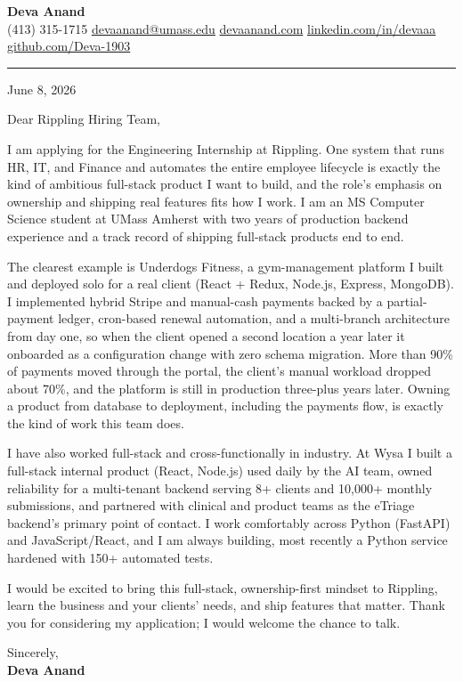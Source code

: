 \documentclass[letterpaper,11pt]{article}
\begin{document}
\pagestyle{empty}

\begin{center}
  {\LARGE \bfseries \textcolor{ResumeNavy}{Deva Anand}} \\ \vspace{3pt}
  \small
  (413) 315-1715 \enspace\textbar\enspace
  \href{mailto:devaanand@umass.edu}{devaanand@umass.edu} \enspace\textbar\enspace
  \href{https://devaanand.com}{devaanand.com} \enspace\textbar\enspace
  \href{https://linkedin.com/in/devaaa/}{linkedin.com/in/devaaa} \enspace\textbar\enspace
  \href{https://github.com/Deva-1903}{github.com/Deva-1903}
\end{center}
\vspace{4pt}
{\color{ResumeNavy}\hrule}
\vspace{10pt}

\textcolor{ResumeSlate}{June 8, 2026}

Dear Rippling Hiring Team,

I am applying for the Engineering Internship at Rippling. One system that runs HR, IT, and Finance and automates the entire employee lifecycle is exactly the kind of ambitious full-stack product I want to build, and the role's emphasis on ownership and shipping real features fits how I work. I am an MS Computer Science student at UMass Amherst with two years of production backend experience and a track record of shipping full-stack products end to end.

The clearest example is Underdogs Fitness, a gym-management platform I built and deployed solo for a real client (React + Redux, Node.js, Express, MongoDB). I implemented hybrid Stripe and manual-cash payments backed by a partial-payment ledger, cron-based renewal automation, and a multi-branch architecture from day one, so when the client opened a second location a year later it onboarded as a configuration change with zero schema migration. More than 90\% of payments moved through the portal, the client's manual workload dropped about 70\%, and the platform is still in production three-plus years later. Owning a product from database to deployment, including the payments flow, is exactly the kind of work this team does.

I have also worked full-stack and cross-functionally in industry. At Wysa I built a full-stack internal product (React, Node.js) used daily by the AI team, owned reliability for a multi-tenant backend serving 8+ clients and 10,000+ monthly submissions, and partnered with clinical and product teams as the eTriage backend's primary point of contact. I work comfortably across Python (FastAPI) and JavaScript/React, and I am always building, most recently a Python service hardened with 150+ automated tests.

I would be excited to bring this full-stack, ownership-first mindset to Rippling, learn the business and your clients' needs, and ship features that matter. Thank you for considering my application; I would welcome the chance to talk.

\vspace{6pt}
Sincerely, \\
\textbf{Deva Anand}
\end{document}
